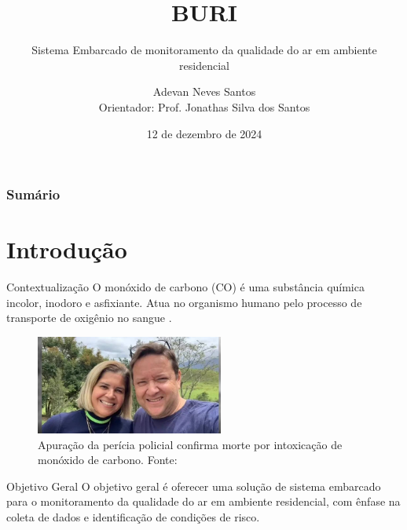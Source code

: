 \documentclass[12pt]{beamer}
\title{BURI}
\subtitle{Sistema Embarcado de monitoramento da qualidade do ar em ambiente residencial}
\author{Adevan Neves Santos \\ Orientador: Prof. Jonathas Silva dos Santos}
\date{12 de dezembro de 2024}
\begin{document}
    \maketitle

    \begin{frame}
        \frametitle{Sumário}
        \tableofcontents
    \end{frame}

    \section{Introdução}

    \begin{frame}{Contextualização}
        O monóxido de carbono (CO) é uma substância química incolor, inodoro e asfixiante. Atua no organismo humano pelo processo 
        de transporte de oxigênio no sangue \cite{carbon-monoxide-poisoning-varon}.
        \begin{figure}[ht]
            \centering
            \includegraphics[width=0.55\textwidth]{img/morte-co.jpg}
            \caption{Apuração da perícia policial confirma morte por intoxicação de monóxido de carbono. Fonte: \cite{noticia-manaus-fumaca}}\label{fig:context}
        \end{figure}         
    \end{frame}

    \begin{frame}{Objetivo Geral}
        O objetivo geral é oferecer uma solução de sistema embarcado para o monitoramento
        da qualidade do ar em ambiente residencial, com ênfase na coleta de dados e identificação de
        condições de risco. 
    \end{frame}
\end{document}
